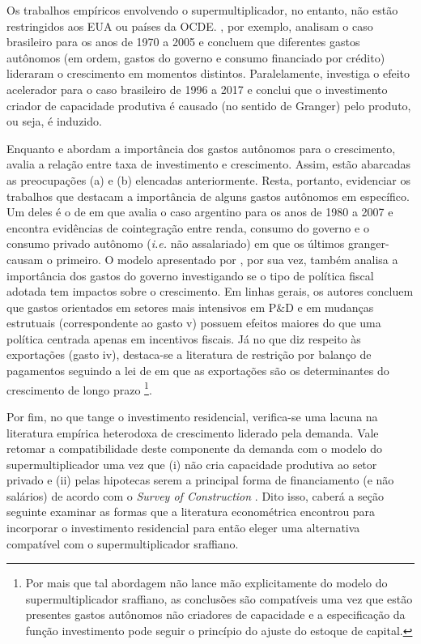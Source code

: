Os trabalhos empíricos envolvendo o supermultiplicador, no entanto, não estão restringidos aos EUA ou países da OCDE. \textcite{freitas_pattern_2013}, por exemplo, analisam o caso brasileiro para os anos de 1970 a 2005 e concluem que diferentes gastos autônomos (em ordem, gastos do governo e consumo financiado por crédito) lideraram o crescimento em momentos distintos. Paralelamente, \textcite{braga_investment_2018} investiga o efeito acelerador para o caso brasileiro de 1996 a 2017 e conclui que o investimento criador de capacidade produtiva é causado (no sentido de Granger) pelo produto, ou seja, é induzido.  

Enquanto \textcite{freitas_pattern_2013} e \textcite{girardi_autonomous_2015} abordam a importância dos gastos autônomos para o crescimento, \textcite{braga_investment_2018} avalia a relação entre taxa de investimento e crescimento. Assim, estão abarcadas as preocupações (a) e (b) elencadas anteriormente. Resta, portanto, evidenciar os trabalhos que destacam a importância de alguns gastos autônomos em específico. Um deles é o de \textcite{medici_cointegration_2011} em que avalia o caso argentino para os anos de 1980 a 2007 e encontra evidências de cointegração entre renda, consumo do governo e o consumo privado autônomo (\textit{i.e.} não assalariado) em que os últimos granger-causam o primeiro. O modelo apresentado por \textcite{deleidi_mission-oriented_2019}, por sua vez, também analisa a importância dos gastos do governo investigando se o tipo de política fiscal adotada tem impactos sobre o crescimento. Em linhas gerais, os autores concluem que gastos orientados em setores mais intensivos em P\&D e em mudanças estrutuais (correspondente ao gasto v) possuem efeitos maiores do que uma política centrada apenas em incentivos fiscais. Já no que diz respeito às exportações (gasto iv), destaca-se a literatura de restrição por balanço de pagamentos seguindo a lei de \textcite{mccombie_balance--payments_1994} 
em que as exportações são os determinantes do crescimento de longo prazo \cites{atesoglu_balance--payments-constrained_1993}{mccombie_empirics_1997}{moreno-brid_mexicos_1999}{bertola_balance--payments-constrained_2002}\footnote{Por mais que tal abordagem não lance mão explicitamente do modelo do supermultiplicador sraffiano, as conclusões são compatíveis uma vez que estão presentes gastos autônomos não criadores de capacidade e a especificação da função investimento pode seguir o princípio do ajuste do estoque de capital.}.


Por fim, no que tange o investimento residencial, verifica-se uma lacuna na literatura empírica heterodoxa de crescimento liderado pela demanda. Vale retomar a compatibilidade deste componente da demanda com o modelo do supermultiplicador uma vez que (i) não cria   capacidade produtiva ao setor privado e (ii) pelas hipotecas serem a principal forma de financiamento (e não salários) de acordo com o \textit{Survey of Construction} \cite{us_census_bureau_characteristics_2017}. Dito isso, caberá a seção seguinte examinar as formas que a literatura econométrica encontrou para incorporar o investimento residencial para então eleger uma alternativa compatível com o supermultiplicador sraffiano.
